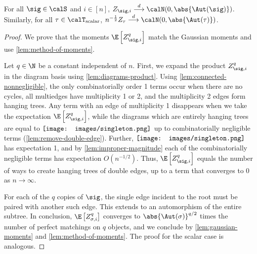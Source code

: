 \documentclass[12pt]{article}
\newcommand{\rootpic}{\vcenter{\hbox{\texttt{[image: images/singleton.png]}}}}
\newcommand{\scalar}{\textnormal{scalar}}
\begin{document}
\begin{lemma}\label{lem:Ztau-normal}
    For all $\sig \in \calS$ and $i\in [n]$, $Z_{\sig, i} \overset{d}{\longrightarrow} \calN(0, \abs{\Aut(\sig)})$. Similarly, for all $\tau\in\calT_{\scalar}$, $n^{-\frac 1 2} Z_\tau\overset{d}{\longrightarrow} \calN(0, \abs{\Aut(\tau)})$.
\end{lemma}
\begin{proof}
    We prove that the moments $\E\left [Z_{\sig,i}^q\right]$ match the Gaussian moments and use \cref{lem:method-of-moments}.
    
    Let $q \in \N$ be a constant independent of $n$.
    First, we expand the product $Z_{\sig, i}^q$ in the diagram basis
    using \cref{lem:diagrams-product}.
    Using \cref{lem:connected-nonnegligible}, the only combinatorially order
    1 terms occur when there are no cycles, all multiedges have multiplicity 1 or 2,
    and the multiplicity 2 edges form hanging trees.
    Any term with an edge of multiplicity 1 disappears when we take the
    expectation $\E\left [Z_{\sig,i}^q\right]$,
    while the diagrams which are entirely hanging trees are equal to $\rootpic$ up to combinatorially negligible terms (\cref{lem:remove-double-edge}). Further, $\rootpic$ has expectation 1, and by \cref{lem:improper-magnitude} each of the combinatorially
    negligible terms has expectation $O(n^{-1/2})$.
    Thus, $\E\left[Z_{\sig,i}^q\right]$ equals the number of ways to create hanging
    trees of double edges, up to a term that converges to 0 as $n\to\infty$.

    For each of the $q$ copies of $\sig$, the single edge incident
    to the root must be paired with another such edge.
    This extends to an automorphism of the entire subtree.
    In conclusion, $\E \left[Z_{\sigma,i}^q\right]$ converges to $\abs{\Aut(\sigma)}^{q/2}$ times the number of perfect matchings on $q$ objects, and we conclude by \cref{lem:gaussian-moments} and \cref{lem:method-of-moments}.
    The proof for the scalar case is analogous.
\end{proof}
\end{document}
